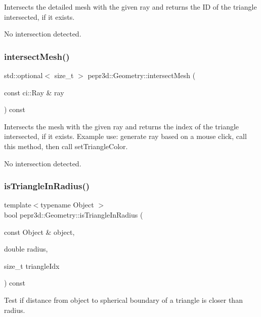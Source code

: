 Intersects the detailed mesh with the given ray and returns the ID of the triangle intersected, if it exists. 

No intersection detected. \mbox{\label{classpepr3d_1_1_geometry_ace58dc7a4182240000e9b773cb8da4ee}} 
\subsubsection{\texorpdfstring{intersectMesh()}{intersectMesh()}}
{\footnotesize\ttfamily std\+::optional$<$ size\+\_\+t $>$ pepr3d\+::\+Geometry\+::intersect\+Mesh (\begin{DoxyParamCaption}\item[{const ci\+::\+Ray \&}]{ray }\end{DoxyParamCaption}) const}



Intersects the mesh with the given ray and returns the index of the triangle intersected, if it exists. Example use\+: generate ray based on a mouse click, call this method, then call set\+Triangle\+Color. 

No intersection detected. \mbox{\label{classpepr3d_1_1_geometry_a993a7383980e9c4aa955ae156d714f15}} 
\subsubsection{\texorpdfstring{isTriangleInRadius()}{isTriangleInRadius()}}
{\footnotesize\ttfamily template$<$typename Object $>$ \\
bool pepr3d\+::\+Geometry\+::is\+Triangle\+In\+Radius (\begin{DoxyParamCaption}\item[{const Object \&}]{object,  }\item[{double}]{radius,  }\item[{size\+\_\+t}]{triangle\+Idx }\end{DoxyParamCaption}) const\hspace{0.3cm}{\ttfamily [inline]}}



Test if distance from object to spherical boundary of a triangle is closer than radius. 


